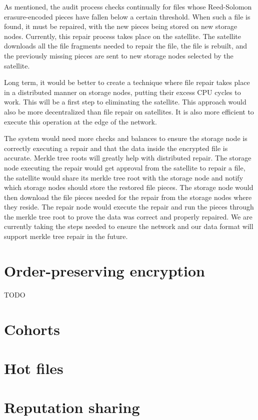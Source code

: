 \documentclass[11pt,fleqn,openany]{book}
\newcommand{\todo}[1]{{\color{red} TODO #1 }}
\begin{document}
As mentioned, the audit process checks continually for files whose Reed-Solomon
erasure-encoded pieces have fallen below a certain threshold. When such a file
is found, it must be repaired, with
the new pieces being stored on new storage nodes.
Currently, this
repair process takes place on the satellite. The satellite downloads all
the file fragments needed to repair the file, the file is rebuilt, and the
previously missing pieces are sent to new storage nodes
selected by the satellite.

Long term, it would be better to create a technique where file repair takes
place in a distributed manner on storage nodes, putting their excess CPU
cycles
to work. This will be a first step to eliminating the satellite. This
approach would also be more decentralized than file repair on satellites. It
is also more efficient to execute this operation at the edge of the network.

The system would need more checks and balances to ensure the storage node is
correctly
executing a repair and that the data inside the encrypted file is accurate.
Merkle tree roots will greatly help with distributed repair. The storage
node
executing the repair would get approval from the satellite to repair a file,
the satellite would share its merkle tree root with the storage node and
notify
which storage nodes should store the restored file pieces. The storage node
would then
download the file pieces needed for the repair from the storage nodes where they
reside. The repair node would execute the repair and run the pieces
through the merkle tree root to prove the data was correct and properly
repaired. We are currently taking the steps needed to ensure the network and our
data format will support merkle tree repair in the future.

\section{Order-preserving encryption}

\todo{}

\section{Cohorts}
\section{Hot files}\label{sec:future-hot-files}
\section{Reputation sharing}
\end{document}
